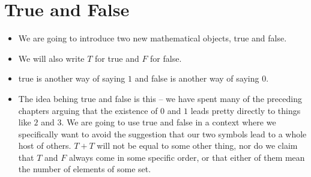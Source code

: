\chapter{True and False}
\label{true}

\begin{itemize}
\item
We are going to introduce two new mathematical objects, {\sc true} and {\sc false}.
\item
We will also write $T$ for {\sc true} and $F$ for {\sc false}.
\item
{\sc true} is another way of saying $1$ and {\sc false} is another way of saying $0$.
\item
The idea behing {\sc true} and {\sc false} is this -- we have spent many of the preceding chapters arguing that the existence of $0$ and $1$ leads pretty directly to things like $2$ and $3$. We are going to use {\sc true} and {\sc false} in a context where we specifically want to avoid the suggestion that our two symbols lead to a whole host of others. $T + T$ will not be equal to some other thing, nor do we claim that $T$ and $F$ always come in some specific order, or that either of them mean the number of elements of some set.


\end{itemize}
